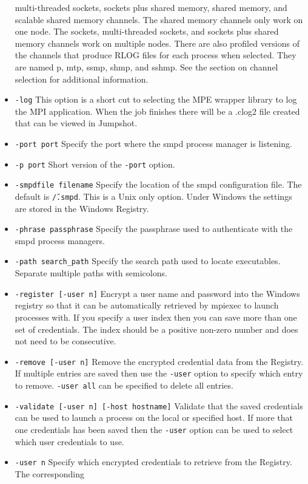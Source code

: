 \documentclass[dvipdfm,11pt]{article}
\begin{document}
\begin{itemize}
multi-threaded sockets, sockets plus shared memory, shared memory, and scalable
shared memory channels.  The shared memory channels only work on one node.  
The sockets, multi-threaded sockets, and sockets plus shared memory channels 
work on multiple nodes.  There are also profiled versions of the channels that
produce RLOG files for each process when selected.  They are named p, mtp, ssmp,
shmp, and sshmp.  See the section on channel selection for additional information.
\item \texttt{-log}
This option is a short cut to selecting the MPE wrapper library to log the MPI
application.  When the job finishes there will be a .clog2 file created that
can be viewed in Jumpshot.
\item \texttt{-port port}
Specify the port where the smpd process manager is listening.
\item \texttt{-p port}
Short version of the \texttt{-port} option.
\item \texttt{-smpdfile filename}
Specify the location of the smpd configuration file.  The default is \texttt{\~/.smpd}.
This is a Unix only option.  Under Windows the settings are stored in the Windows Registry.
\item \texttt{-phrase passphrase}
Specify the passphrase used to authenticate with the smpd process managers.
\item \texttt{-path search\_path}
Specify the search path used to locate executables.  Separate multiple paths with semicolons.
\item \texttt{-register [-user n]}
Encrypt a user name and password into the Windows registry so that it can be 
automatically retrieved by mpiexec to launch processes with.  If you specify
a user index then you can save more than one set of credentials.  The index
should be a positive non-zero number and does not need to be consecutive.
\item \texttt{-remove [-user n]}
Remove the encrypted credential data from the Registry.  If multiple entries are
saved then use the \texttt{-user} option to specify which entry to remove.
\texttt{-user all} can be specified to delete all entries.
\item \texttt{-validate [-user n] [-host hostname]}
Validate that the saved credentials can be used to launch a process on the local
or specified host.  If more that one credentials has been saved then the 
\texttt{-user} option can be used to select which user credentials to use.
\item \texttt{-user n}
Specify which encrypted credentials to retrieve from the Registry.  The corresponding

\end{itemize}
\end{document}
